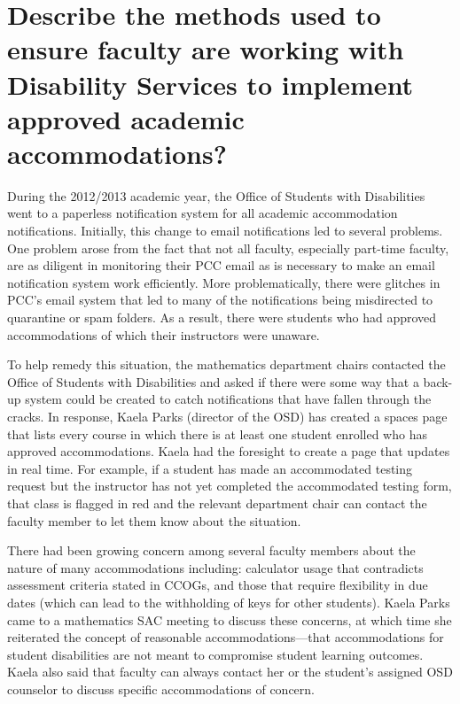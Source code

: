\section[Approved academic accommodations]{Describe the methods used to ensure
  faculty are working with Disability Services to implement approved academic
  accommodations?}
During the 2012/2013 academic year, the Office of Students with Disabilities went to a paperless notification system for all academic accommodation notifications.
Initially, this change to email notifications led to several problems.
One problem arose from the fact that not all faculty, especially part-time faculty, are as diligent in monitoring their PCC email as is necessary to make an email notification system work efficiently.
More problematically, there were glitches in PCC's email system that led to many of the notifications being misdirected to quarantine or spam folders.
As a result, there were students who had approved accommodations of which their instructors were unaware.

To help remedy this situation, the mathematics department chairs contacted the Office of Students with Disabilities and asked if there were some way that a back-up system could be created to catch notifications that have fallen through the cracks.
In response, Kaela Parks (director of the OSD) has created a spaces page that lists every course in which there is at least one student enrolled who has approved accommodations.
Kaela had the foresight to create a page that updates in real time.
For example, if a student has made an accommodated testing request but the instructor has not yet completed the accommodated testing form, that class is flagged in red and the relevant department chair can contact the faculty member to let them know about the situation.

There had been growing concern among several faculty members about the nature of many accommodations including:  calculator usage that contradicts assessment criteria stated in CCOGs, and  those that require flexibility in due dates (which can lead to the withholding of keys for other students).
Kaela Parks came to a mathematics SAC meeting to discuss these concerns, at which time she reiterated the concept of reasonable accommodations---that accommodations for student disabilities are not meant to compromise student learning outcomes.
Kaela also said that faculty can always contact her or the student's assigned OSD counselor to discuss specific accommodations of concern.

